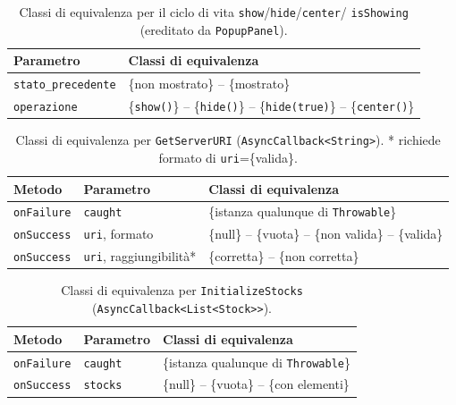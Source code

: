 \begin{table}[H]
\centering
\begin{tabularx}{\textwidth}{>{\raggedright\arraybackslash}p{} >{\raggedright\arraybackslash}X}
\toprule
Parametro & Classi di equivalenza \\
\midrule
\texttt{stato\_precedente} & \{non mostrato\} -- \{mostrato\} \\
\texttt{operazione} & \{\texttt{show()}\} -- \{\texttt{hide()}\} -- \{\texttt{hide(true)}\} --
\{\texttt{center()}\} \\
\bottomrule
\end{tabularx}
\caption{Classi di equivalenza per il ciclo di vita \texttt{show}/\texttt{hide}/\texttt{center}/
\texttt{isShowing} (ereditato da \texttt{PopupPanel}).}
\label{tab:logindialog-lifecycle-classi}
\end{table}

\begin{table}[H]
\centering
\begin{tabularx}{\textwidth}{l >{\raggedright\arraybackslash}p{} >{\raggedright\arraybackslash}X}
\toprule
Metodo & Parametro & Classi di equivalenza \\
\midrule
\texttt{onFailure} & \texttt{caught} & \{istanza qualunque di \texttt{Throwable}\} \\
\midrule
\texttt{onSuccess} & \texttt{uri}, formato & \{null\} -- \{vuota\} -- \{non valida\} --
\{valida\} \\
\texttt{onSuccess} & \texttt{uri}, raggiungibilità* & \{corretta\} -- \{non corretta\} \\
\bottomrule
\end{tabularx}
\caption{Classi di equivalenza per \texttt{GetServerURI} (\texttt{AsyncCallback<String>}).
* richiede formato di \texttt{uri}=\{valida\}.}
\label{tab:logindialog-getserveruri-classi}
\end{table}

\begin{table}[H]
\centering
\begin{tabularx}{\textwidth}{l >{\raggedright\arraybackslash}p{} >{\raggedright\arraybackslash}X}
\toprule
Metodo & Parametro & Classi di equivalenza \\
\midrule
\texttt{onFailure} & \texttt{caught} & \{istanza qualunque di \texttt{Throwable}\} \\
\midrule
\texttt{onSuccess} & \texttt{stocks} & \{null\} -- \{vuota\} -- \{con elementi\} \\
\bottomrule
\end{tabularx}
\caption{Classi di equivalenza per \texttt{InitializeStocks}
(\texttt{AsyncCallback<List<Stock>>}).}
\label{tab:logindialog-initializestocks-classi}
\end{table}


